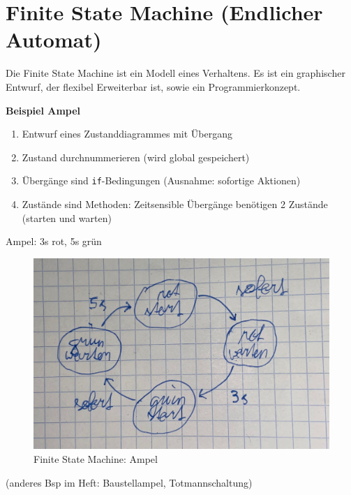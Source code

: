 \chapter{Finite State Machine (Endlicher Automat)}
Die Finite State Machine ist ein Modell eines Verhaltens. Es ist ein graphischer Entwurf, der flexibel Erweiterbar ist, sowie ein Programmierkonzept.

\textbf{Beispiel Ampel} \\
\begin{enumerate}
	\item Entwurf eines Zustanddiagrammes mit Übergang
	\item Zustand durchnummerieren (wird global gespeichert)
	\item Übergänge sind \texttt{if}-Bedingungen (Ausnahme: sofortige Aktionen)
	\item Zustände sind Methoden: Zeitsensible Übergänge benötigen 2 Zustände (starten und warten)
\end{enumerate}
Ampel: 3s rot, 5s grün
\begin{figure}[H]
	\centering
	\includegraphics[width=0.8\linewidth]{figures/ampel.jpeg}
	\caption{Finite State Machine: Ampel}
\end{figure}

(anderes Bsp im Heft: Baustellampel, Totmannschaltung)